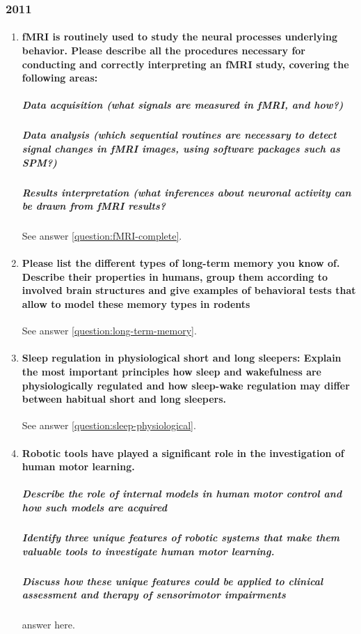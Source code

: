\documentclass[12pt,article,oneside,a4paper]{memoir}
\begin{document}
\subsubsection{2011}
\begin{enumerate}
\item \paragraph{ fMRI is routinely used to study the neural processes underlying behavior. Please describe all the procedures necessary for conducting and correctly interpreting an fMRI study, covering the following areas:}
\subparagraph{Data acquisition (what signals are measured in fMRI, and how?)}
\subparagraph{Data analysis (which sequential routines are necessary to detect signal changes in fMRI images, using software packages such as SPM?)}
\subparagraph{Results interpretation (what inferences about neuronal activity can be drawn from fMRI results?}

See answer \ref{question:fMRI-complete}.

\item \paragraph{Please list the different types of long-term memory you know of. Describe their properties in humans, group them according to involved brain structures and give examples of behavioral tests that allow to model these memory types in rodents}

See answer \ref{question:long-term-memory}.

\item \paragraph{Sleep regulation in physiological short and long sleepers: Explain the most important principles how sleep and wakefulness are physiologically regulated and how sleep-wake regulation may differ between habitual short and long sleepers.}

See answer \ref{question:sleep-physiological}.

\item \paragraph{Robotic tools have played a significant role in the investigation of human motor
learning.}
\subparagraph{Describe the role of internal models in human motor control and how such
models are acquired}
\subparagraph{Identify three unique features of robotic systems that make them valuable tools to investigate human motor learning.}
\subparagraph{Discuss how these unique features could be applied to clinical assessment and therapy of sensorimotor impairments} answer here.


\end{enumerate}
\end{document}
